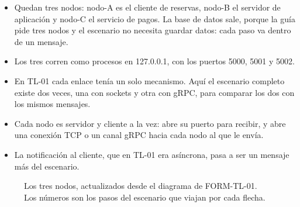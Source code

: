 \documentclass[11pt,a4paper]{article}
\begin{document}
\begin{itemize}[leftmargin=*]
  \item Quedan tres nodos: nodo-A es el cliente de reservas, nodo-B el servidor de aplicación y nodo-C el servicio de pagos. La base de datos sale, porque la guía pide tres nodos y el escenario no necesita guardar datos: cada paso va dentro de un mensaje.
  \item Los tres corren como procesos en 127.0.0.1, con los puertos 5000, 5001 y 5002.
  \item En TL-01 cada enlace tenía un solo mecanismo. Aquí el escenario completo existe dos veces, una con sockets y otra con gRPC, para comparar los dos con los mismos mensajes.
  \item Cada nodo es servidor y cliente a la vez: abre su puerto para recibir, y abre una conexión TCP o un canal gRPC hacia cada nodo al que le envía.
  \item La notificación al cliente, que en TL-01 era asíncrona, pasa a ser un mensaje más del escenario.
\end{itemize}

\begin{figure}[H]
\centering
{}
\caption{Los tres nodos, actualizados desde el diagrama de FORM-TL-01. Los números son los pasos del escenario que viajan por cada flecha.}
\label{fig:arquitectura}
\end{figure}
\end{document}
